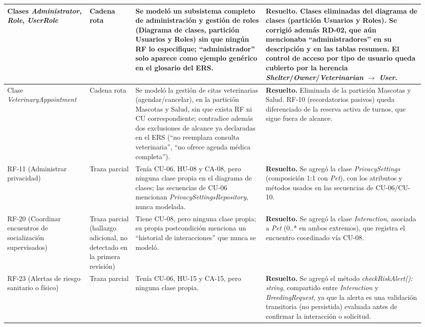 \documentclass[journal,onecolumn]{IEEEtran}
\begin{document}
\begin{longtable}{|L{3.4cm}|L{1.8cm}|L{4.6cm}|L{4.6cm}|}
	\small
	Clases \textit{Administrator}, \textit{Role}, \textit{UserRole} & Cadena rota & Se modeló un subsistema completo de administración y gestión de roles (Diagrama de clases, partición Usuarios y Roles) sin que ningún RF lo especifique; ``administrador'' solo aparece como ejemplo genérico en el glosario del ERS. & \textbf{Resuelto.} Clases eliminadas del diagrama de clases (partición Usuarios y Roles). Se corrigió además RD-02, que aún mencionaba ``administradores'' en su descripción y en las tablas resumen. El control de acceso por tipo de usuario queda cubierto por la herencia \textit{Shelter}/\textit{Owner}/\textit{Veterinarian} $\to$ \textit{User}. \\
	\hline
	Clase \textit{VeterinaryAppointment} & Cadena rota & Se modeló la gestión de citas veterinarias (agendar/cancelar), en la partición Mascotas y Salud, sin que exista RF ni CU correspondiente; contradice además dos exclusiones de alcance ya declaradas en el ERS (``no reemplaza consulta veterinaria'', ``no ofrece agenda médica completa''). & \textbf{Resuelto.} Eliminada de la partición Mascotas y Salud. RF-10 (recordatorios pasivos) queda diferenciado de la reserva activa de turnos, que sigue fuera de alcance. \\
	\hline
	RF-11 (Administrar privacidad) & Traza parcial & Tenía CU-06, HU-08 y CA-08, pero ninguna clase propia en el diagrama de clases; las secuencias de CU-06 mencionan \textit{PrivacySettingsRepository}, nunca modelada. & \textbf{Resuelto.} Se agregó la clase \textit{PrivacySettings} (composición 1:1 con \textit{Pet}), con los atributos y métodos usados en las secuencias de CU-06/CU-10. \\
	\hline
	RF-20 (Coordinar encuentros de socialización supervisados) & Traza parcial (hallazgo adicional, no detectado en la primera revisión) & Tiene CU-08, pero ninguna clase propia; su propia postcondición menciona un ``historial de interacciones'' que nunca se modeló. & \textbf{Resuelto.} Se agregó la clase \textit{Interaction}, asociada a \textit{Pet} (0..* en ambos extremos), que registra el encuentro coordinado vía CU-08. \\
	\hline
	RF-23 (Alertas de riesgo sanitario o físico) & Traza parcial & Tenía CU-06, HU-15 y CA-15, pero ninguna clase propia. & \textbf{Resuelto.} Se agregó el método \textit{checkRiskAlert(): string}, compartido entre \textit{Interaction} y \textit{BreedingRequest}, ya que la alerta es una validación transitoria (no persistida) evaluada antes de confirmar la interacción o solicitud. \\
	\hline
\end{longtable}
\end{document}
